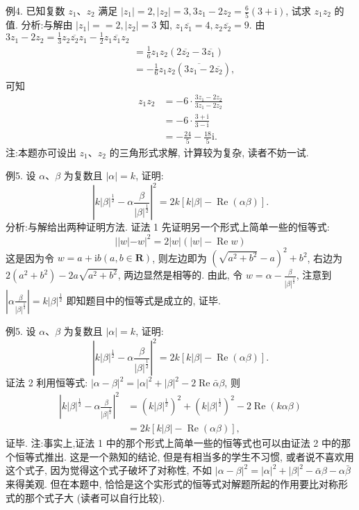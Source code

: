 例4. 已知复数 $z_1 、 z_2$ 满足 $\left|z_1\right|=2,\left|z_2\right|=3,3 z_1-2 z_2=\frac{6}{5}(3+\mathrm{i})$, 试求 $z_1 z_2$ 的值.
分析:与解由 $\left|z_1\right|==2,\left|z_2\right|=3$ 知, $z_1 \overline{z_1}=4, z_2 \overline{z_2}=9$.
由 $3 z_1-2 z_2=\frac{1}{3} z_2 \overline{z_2} z_1-\frac{1}{2} z_1 \overline{z_1} z_2$
$$
\begin{aligned}
& =\frac{1}{6} z_1 z_2\left(2 \overline{z_2}-3 \overline{z_1}\right) \\
& =-\frac{1}{6} z_1 z_2\left(\overline{3 z_1-2} \overline{z_2}\right),
\end{aligned}
$$
可知
$$
\begin{aligned}
z_1 z_2 & =-6 \cdot \frac{3 z_1-2 z_2}{3 z_1-2 z_2} \\
& =-6 \cdot \frac{3+\mathrm{i}}{3-\mathrm{i}} \\
& =-\frac{24}{5}-\frac{18}{5} \mathrm{i} .
\end{aligned}
$$
注:本题亦可设出 $z_1 、 z_2$ 的三角形式求解, 计算较为复杂, 读者不妨一试.



例5. 设 $\alpha 、 \beta$ 为复数且 $|\alpha|=k$, 证明:
$$
\left|k| \beta |^{\frac{1}{2}}-\alpha \frac{\beta}{|\beta|^{\frac{1}{2}}}\right|^2=2 k[k|\beta|-\operatorname{Re}(\alpha \beta)] .
$$
分析:与解给出两种证明方法.
证法 1 先证明另一个形式上简单一些的恒等式:
$$
|| w|-w|^2=2|w|(|w|-\operatorname{Re} w) 
$$
这是因为令 $w=a+\mathrm{i} b(a, b \in \mathbf{R})$, 则左边即为 $\left(\sqrt{a^2+b^2}-a\right)^2+b^2$, 右边为 $2\left(a^2+b^2\right)-2 a \sqrt{a^2+b^2}$, 两边显然是相等的.
由此, 令 $w=\alpha-\frac{\beta}{|\beta|^{\frac{1}{2}}}$, 注意到 $\left|\alpha \frac{\beta}{|\beta|^{\frac{1}{2}}}\right|=k|\beta|^{\frac{1}{2}}$ 即知题目中的恒等式是成立的, 证毕.



例5. 设 $\alpha 、 \beta$ 为复数且 $|\alpha|=k$, 证明:
$$
\left|k| \beta |^{\frac{1}{2}}-\alpha \frac{\beta}{|\beta|^{\frac{1}{2}}}\right|^2=2 k[k|\beta|-\operatorname{Re}(\alpha \beta)] .
$$
证法 2 利用恒等式: $|\alpha-\beta|^2=|\alpha|^2+|\beta|^2-2 \operatorname{Re} \bar{\alpha} \beta$, 则
$$
\begin{aligned}
\left|k| \beta |^{\frac{1}{2}}-\alpha \frac{\beta}{|\beta|^{\frac{1}{2}}}\right|^2 & =\left(k|\beta|^{\frac{1}{2}}\right)^2+\left(k|\beta|^{\frac{1}{2}}\right)^2-2 \operatorname{Re}(k \alpha \beta) \\
& =2 k[k|\beta|-\operatorname{Re}(\alpha \beta)],
\end{aligned}
$$
证毕.
注:事实上,证法 1 中的那个形式上简单一些的恒等式也可以由证法 2 中的那个恒等式推出.
这是一个熟知的结论, 但是有相当多的学生不习惯, 或者说不喜欢用这个式子, 因为觉得这个式子破坏了对称性, 不如 $|\alpha-\beta|^2= |\alpha|^2+|\beta|^2-\bar{\alpha} \beta-\alpha \bar{\beta}$ 来得美观.
但在本题中, 恰恰是这个实形式的恒等式对解题所起的作用要比对称形式的那个式子大 (读者可以自行比较).



